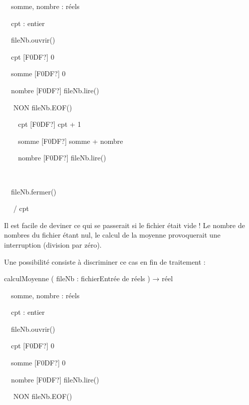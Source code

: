 {\sffamily
\ \ somme, nombre : réels}

{\sffamily
\ \ cpt : entier}


\bigskip

{\sffamily
\ \ fileNb.ouvrir()}

{\sffamily
\ \ cpt {\textrm{[F0DF?]}} 0}

{\sffamily
\ \ somme {\textrm{[F0DF?]}} 0}

{\sffamily
\ \ nombre {\textrm{[F0DF?]}} fileNb.lire()}

{\sffamily
\ \   NON fileNb.EOF()
}

{\sffamily
\ \ \ \ cpt {\textrm{[F0DF?]}} cpt + 1}

{\sffamily
\ \ \ \ somme {\textrm{[F0DF?]}} somme + nombre}

{\sffamily
\ \ \ \ nombre {\textrm{[F0DF?]}} fileNb.lire()}

{\sffamily
\ \   }

{\sffamily
\ \ fileNb.fermer()}

{\sffamily
\ \  / cpt}


\bigskip

{\sffamily
{} }

{
Il est facile de deviner ce qui se passerait si le fichier était vide !
Le nombre de nombres du fichier étant nul, le calcul de la moyenne
provoquerait une interruption (division par zéro). }

{
Une possibilité consiste à discriminer ce cas en fin de traitement :}

{\sffamily
{} calculMoyenne ( fileNb : fichierEntrée de réels
) {→} réel}


\bigskip

{\sffamily
\ \ somme, nombre : réels}

{\sffamily
\ \ cpt : entier}


\bigskip

{\sffamily
\ \ fileNb.ouvrir()}

{\sffamily
\ \ cpt {\textrm{[F0DF?]}} 0}

{\sffamily
\ \ somme {\textrm{[F0DF?]}} 0}

{\sffamily
\ \ nombre {\textrm{[F0DF?]}} fileNb.lire()}

{\sffamily
\ \   NON fileNb.EOF()
}

